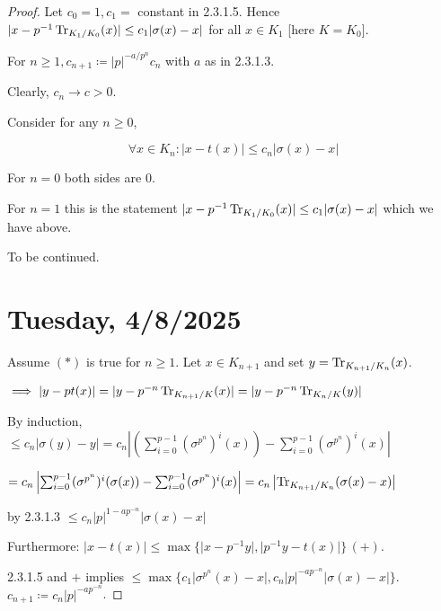 \documentclass{article}
\theoremstyle{definition}
\numberwithin{theorem}{subsection}
\begin{document}
    \begin{proof}
        Let \(c_0 = 1, c_1 =\) constant in 2.3.1.5. Hence \(\vert  x - p ^{-1} \Tr_{K_1 / K_0} (x) \vert \leq c_1 \vert \sigma(x) - x \vert\) for all \(x \in K_1\) [here \(K = K_0\)].

        For \(n \geq 1, c_{n+1} \coloneqq \vert p \vert^{- a / p^n} c_n\) with \(a\) as in 2.3.1.3.
        
        Clearly, \(c_n \to c > 0\).

        Consider for any \(n \geq 0\),

        \[
            \forall x\in K_n: \vert x - t(x) \vert \leq c_n \vert \sigma(x) - x \vert \tag*{$(\ast)$}
        \]

        For \(n = 0\) both sides are \(0\).

        For \(n = 1\) this is the statement \(\vert  x - p ^{-1} \Tr_{K_1 / K_0}(x) \vert \leq c_1 \vert \sigma(x) - x \vert\) which we have above.

        To be continued.

        \section*{Tuesday, 4/8/2025}
        
        Assume \((\ast)\) is true for \(n \geq 1\). Let \(x\in K_{n+1}\) and set \(y = \Tr_{K_{n+1} / K_n}(x)\).
        
        \(\implies \vert y - p t (x) \vert  = \vert y - p^{-n} \Tr_{K_{n+1} / K}(x) \vert = \vert y - p^{-n} \Tr_{K_n / K}(y) \vert\) 

        By induction, \(\leq c_n \vert \sigma(y) - y \vert = c_n \left\vert \left( \sum_{i=0}^{p-1} (\sigma^{p^n})^i (x) \right) - \sum_{i=0}^{p-1} (\sigma^{p^n})^i(x) \right\vert \) 

        \(= c_n \left\vert \sum_{i=0}^{p-1} (\sigma^{p^n})^i (\sigma (x)) - \sum_{i=0}^{p-1} (\sigma^{p^n})^i(x) \right\vert = c_n \left\vert \Tr_{K_{n+1} / K_n} (\sigma(x) - x) \right\vert  \) 
        

        by 2.3.1.3 \(\leq c_n \vert p \vert^{1-ap^{-n}} \vert \sigma(x) - x \vert\) 

        Furthermore: \(\vert x - t(x) \vert \leq \max \{ \vert x - p ^{-1} y \vert, \vert p ^{-1} y - t(x) \vert \} \, (+)\).

        2.3.1.5 and \(+\) implies \(\leq \max \{ c_1 \vert \sigma^{p^n}(x) - x \vert, c_n \vert p \vert^{-ap^{-n}} \vert \sigma(x) - x \vert \} \). \(c_{n+1} \coloneqq c_n \vert p \vert^{- a p^{-n}}\).
        

\end{proof}
\end{document}
